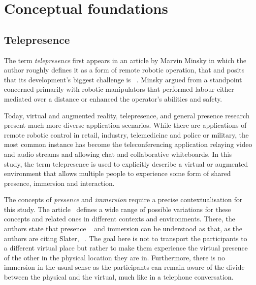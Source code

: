 \chapter{Conceptual foundations}
\label{ch:conceptualfoundations}

\section{Telepresence}\label{sec:telepresence}

The term \emph{telepresence} first appears in an article by Marvin Minsky in which the author roughly defines it as a form of remote robotic operation, that  and posits that its development's biggest challenge is ~\parencite{minskyTelepresence}.
Minsky argued from a standpoint concerned primarily with robotic manipulators that performed labour either mediated over a distance or enhanced the operator's abilities and safety.

Today, virtual and augmented reality, telepresence, and general presence research present much more diverse application scenarios.
While there are applications of remote robotic control in retail, industry, telemedicine and police or military, the most common instance has become the teleconferencing application relaying video and audio streams and allowing chat and collaborative whiteboards.
In this study, the term telepresence is used to explicitly describe a virtual or augmented environment that allows multiple people to experience some form of shared presence, immersion and interaction.

The concepts of \emph{presence} and \emph{immersion} require a precise contextualisation for this study.
The article~ defines a wide range of possible variations for these concepts and related ones in different contexts and environments.
There, the authors state that presence ~\parencite[2]{surveyOfPresence} and immersion can be understood as  that, as the authors are citing Slater, ~\parencite[3]{surveyOfPresence}.
The goal here is not to transport the participants to a different virtual place but rather to make them experience the virtual presence of the other in the physical location they are in.
Furthermore, there is no immersion in the usual sense as the participants can remain aware of the divide between the physical and the virtual, much like in a telephone conversation.

